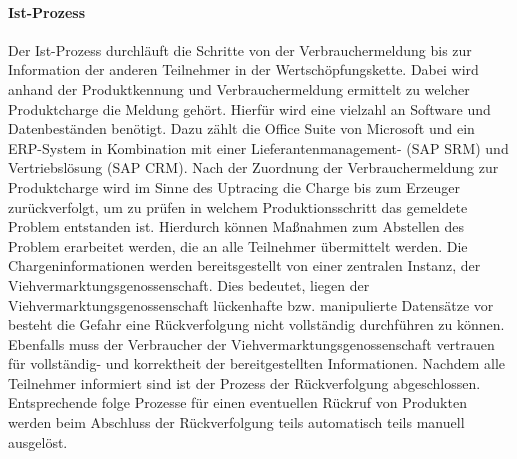\paragraph{Ist-Prozess}
Der Ist-Prozess durchläuft die Schritte von der Verbrauchermeldung bis zur Information der anderen Teilnehmer in der Wertschöpfungskette. Dabei wird anhand der Produktkennung und Verbrauchermeldung ermittelt zu welcher Produktcharge die Meldung gehört. Hierfür wird eine vielzahl an Software und Datenbeständen benötigt. Dazu zählt die Office Suite von Microsoft und ein ERP-System in Kombination mit einer Lieferantenmanagement- (SAP SRM) und Vertriebslösung (SAP CRM). Nach der Zuordnung der Verbrauchermeldung zur Produktcharge wird im Sinne des Uptracing die Charge bis zum Erzeuger zurückverfolgt, um zu prüfen in welchem Produktionsschritt das gemeldete Problem entstanden ist. Hierdurch können Maßnahmen zum Abstellen des Problem erarbeitet werden, die an alle Teilnehmer übermittelt werden. Die Chargeninformationen werden bereitsgestellt von einer zentralen Instanz, der Viehvermarktungsgenossenschaft. Dies bedeutet, liegen der Viehvermarktungsgenossenschaft lückenhafte bzw. manipulierte Datensätze vor besteht die Gefahr eine Rückverfolgung nicht vollständig durchführen zu können. Ebenfalls muss der Verbraucher der Viehvermarktungsgenossenschaft vertrauen für vollständig- und korrektheit der bereitgestellten Informationen. Nachdem alle Teilnehmer informiert sind ist der Prozess der Rückverfolgung abgeschlossen. Entsprechende folge Prozesse für einen eventuellen Rückruf von Produkten werden beim Abschluss der Rückverfolgung teils automatisch teils manuell ausgelöst.

